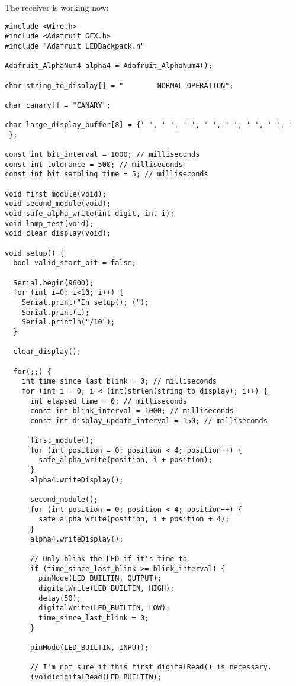 \documentclass[a4paper,notitlepage]{article}
\begin{document}
The receiver is working now:
\begin{verbatim}
#include <Wire.h>
#include <Adafruit_GFX.h>
#include "Adafruit_LEDBackpack.h"

Adafruit_AlphaNum4 alpha4 = Adafruit_AlphaNum4();

char string_to_display[] = "        NORMAL OPERATION";

char canary[] = "CANARY";

char large_display_buffer[8] = {' ', ' ', ' ', ' ', ' ', ' ', ' ', ' '};

const int bit_interval = 1000; // milliseconds
const int tolerance = 500; // milliseconds
const int bit_sampling_time = 5; // milliseconds

void first_module(void);
void second_module(void);
void safe_alpha_write(int digit, int i);
void lamp_test(void);
void clear_display(void);

void setup() {
  bool valid_start_bit = false;

  Serial.begin(9600);
  for (int i=0; i<10; i++) {
    Serial.print("In setup(); (");
    Serial.print(i);
    Serial.println("/10");
  }

  clear_display();

  for(;;) {
    int time_since_last_blink = 0; // milliseconds
    for (int i = 0; i < (int)strlen(string_to_display); i++) {
      int elapsed_time = 0; // milliseconds
      const int blink_interval = 1000; // milliseconds
      const int display_update_interval = 150; // milliseconds

      first_module();
      for (int position = 0; position < 4; position++) {
        safe_alpha_write(position, i + position);
      }
      alpha4.writeDisplay();

      second_module();
      for (int position = 0; position < 4; position++) {
        safe_alpha_write(position, i + position + 4);
      }
      alpha4.writeDisplay();

      // Only blink the LED if it's time to.
      if (time_since_last_blink >= blink_interval) {
        pinMode(LED_BUILTIN, OUTPUT);
        digitalWrite(LED_BUILTIN, HIGH);
        delay(50);
        digitalWrite(LED_BUILTIN, LOW);
        time_since_last_blink = 0;
      }

      pinMode(LED_BUILTIN, INPUT);

      // I'm not sure if this first digitalRead() is necessary.
      (void)digitalRead(LED_BUILTIN);


\end{verbatim}
\end{document}
